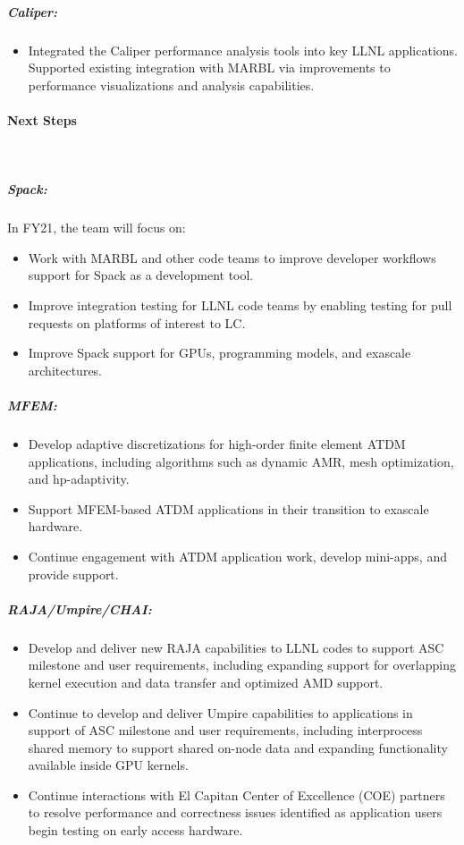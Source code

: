 \subparagraph{Caliper:}
\begin{itemize}
\item Integrated the Caliper performance analysis tools into key LLNL applications. Supported existing integration with MARBL via improvements to performance visualizations and analysis capabilities.
\end{itemize}


\paragraph{Next Steps} \leavevmode \\

\subparagraph{Spack:}
In FY21, the team will focus on:

\begin{itemize}
    \item Work with MARBL and other code teams to improve developer workflows support for Spack as a development tool.
    \item Improve integration testing for LLNL code teams by enabling testing for pull requests on platforms of interest to LC.
    \item Improve Spack support for GPUs, programming models, and exascale architectures.
\end{itemize}

\subparagraph{MFEM:}
\begin{itemize}
\item Develop adaptive discretizations for high-order finite element ATDM applications, including algorithms such as dynamic AMR, mesh optimization, and hp-adaptivity. 
\item Support MFEM-based ATDM applications in their transition to exascale hardware.  
\item Continue engagement with ATDM application work, develop mini-apps, and provide support.
\end{itemize}

\subparagraph{RAJA/Umpire/CHAI:}


\begin{itemize}
\item Develop and deliver new RAJA capabilities to LLNL codes to support ASC milestone and user requirements, including expanding support for overlapping kernel execution and data transfer and optimized AMD support.
\item Continue to develop and deliver Umpire capabilities to applications in support of ASC milestone and user requirements, including interprocess shared memory to support shared on-node data and expanding functionality available inside GPU kernels. 
\item Continue interactions with El Capitan Center of Excellence (COE) partners to resolve performance and correctness issues identified as application users begin testing on early access hardware. 

\end{itemize}

